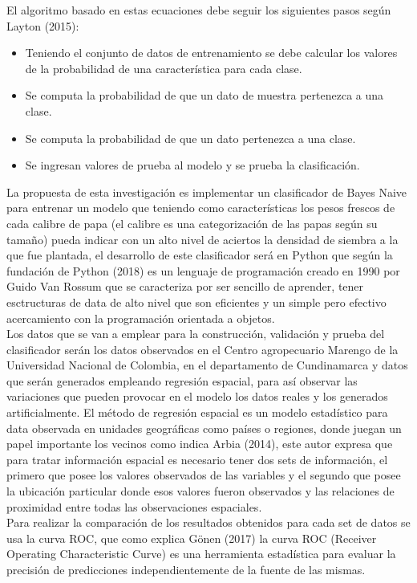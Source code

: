 El algoritmo basado en estas ecuaciones debe seguir los siguientes pasos según Layton (2015):

\begin{itemize}
	\item Teniendo el conjunto de datos de entrenamiento se debe calcular los valores de la probabilidad de una característica para cada clase.
	\item Se computa la probabilidad de que un dato de muestra pertenezca a una clase.
	\item Se computa la probabilidad de que un dato pertenezca a una clase.
	\item Se ingresan valores de prueba al modelo y se prueba la clasificación.
\end{itemize}

La propuesta de esta investigación es implementar un clasificador de Bayes Naive para entrenar un modelo que teniendo como características los pesos frescos de cada calibre de papa (el calibre es una categorización de las papas según su tamaño) pueda indicar con un alto nivel de aciertos la densidad de siembra a la que fue plantada, el desarrollo de este clasificador será en Python que según la fundación de Python (2018) es un lenguaje de programación creado en 1990 por Guido Van Rossum que se caracteriza por ser sencillo de aprender, tener esctructuras de data de alto nivel que son eficientes y un simple pero efectivo acercamiento con la programación orientada a objetos.\\

Los datos que se van a emplear para la construcción, validación y prueba del clasificador serán los datos observados en el Centro agropecuario Marengo de la Universidad Nacional de Colombia, en el departamento de Cundinamarca y datos que serán generados empleando regresión espacial, para así observar las variaciones que pueden provocar en el modelo los datos reales y los generados artificialmente. El método de regresión espacial es un modelo estadístico para data observada en unidades geográficas como países o regiones, donde juegan un papel importante los vecinos como indica Arbia (2014), este autor expresa que para tratar información espacial es necesario tener dos sets de información, el primero que posee los valores observados de las variables y el segundo que posee la ubicación particular donde esos valores fueron observados y las relaciones de proximidad entre todas las observaciones espaciales.\\

Para realizar la comparación de los resultados obtenidos para cada set de datos se usa la curva ROC, que como explica Gönen (2017) la curva ROC (Receiver Operating Characteristic Curve) es una herramienta estadística para evaluar la precisión de predicciones independientemente de la fuente de las mismas.

